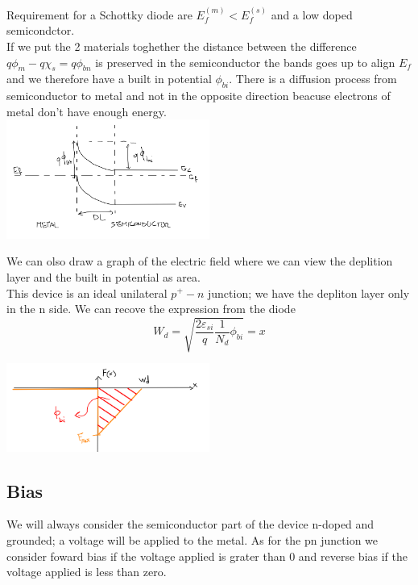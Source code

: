 Requirement for a Schottky diode are $E_f^{(m)}<E_f^{(s)}$ and a low doped semicondctor.\\
If we put the 2 materials toghether the distance between the difference $q\phi_m-q\chi_s=q\phi_{bn}$ is preserved in the semiconductor the bands goes up to align $E_f$ and we therefore have a built in potential $\phi_{bi}$. There is a diffusion process from semiconductor to metal and not in the opposite direction beacuse electrons of metal don't have enough energy.\\

\centering
\includegraphics[width=0.5\textwidth]{ms2.png}\\
\raggedright
  
We can olso draw a graph of the electric field where we can view the deplition layer and the built in potential as area.\\
This device is an ideal unilateral $p^+-n$ junction; we have the depliton layer only in the n side. We can recove the expression from the diode   
\begin{equation}
W_d=\sqrt{\frac{2\varepsilon_{si}}{q}\frac{1}{N_d}\phi_{bi}}=x
\end{equation}  

\centering
\includegraphics[width=0.5\textwidth]{ms3.png}\\
\raggedright

\subsection{Bias}
We will always consider the semiconductor part of the device n-doped and grounded; a voltage will be applied to the metal. As for the pn junction we consider foward bias if the voltage applied is grater than 0 and reverse bias if the voltage applied is less than zero.\\


